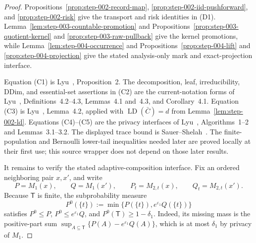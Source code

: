 \begin{proof}
Propositions~\ref{prop:step-002-record-map},
\ref{prop:step-002-iid-pushforward}, and
\ref{prop:step-002-risk} give the transport and risk identities in (D1).
Lemma~\ref{lem:step-003-countable-promotion} and
Propositions~\ref{prop:step-003-quotient-kernel} and
\ref{prop:step-003-raw-pullback} give the kernel promotions, while
Lemma~\ref{lem:step-004-occurrence} and
Propositions~\ref{prop:step-004-lift} and
\ref{prop:step-004-projection} give the stated analysis-only mark and
exact-projection interface.

Equation (C1) is Lyu~\citep{lyu2025}, Proposition~2. The decomposition,
leaf, irreducibility, DDim, and essential-set assertions in (C2) are the
current-notation forms of Lyu~\citep{lyu2025}, Definitions~4.2--4.3,
Lemmas~4.1 and~4.3, and Corollary~4.1. Equation (C3) is Lyu~\citep{lyu2025},
Lemma~4.2, applied with \(\operatorname{LD}(\bar C)=d\) from
Lemma~\ref{lem:step-002-ld}. Equations (C4)--(C5) are the privacy
interfaces of Lyu~\citep{lyu2025}, Algorithms~1--2 and Lemmas~3.1--3.2.
The displayed trace bound is Sauer--Shelah~\citep{sauer1972}. The
finite-population and Bernoulli lower-tail inequalities needed later are
proved locally at their first use; this source wrapper does not depend on
those later results.

It remains to verify the stated adaptive-composition interface. Fix an
ordered neighboring pair \(x,x'\), and write
\[
 P=M_1(x),\qquad Q=M_1(x'),\qquad
 P_t=M_{2,t}(x),\qquad Q_t=M_{2,t}(x').
\]
Because \(\mathsf T\) is finite, the subprobability measure
\[
 P^0(\{t\}):=\min\{P(\{t\}),e^{\varepsilon_1}Q(\{t\})\}
\]
satisfies \(P^0\le P\), \(P^0\le e^{\varepsilon_1}Q\), and
\(P^0(\mathsf T)\ge1-\delta_1\). Indeed, its missing mass is the
positive-part sum
\(\sup_{A\subseteq\mathsf T}\{P(A)-e^{\varepsilon_1}Q(A)\}\), which is at
most \(\delta_1\) by privacy of \(M_1\).


\end{proof}
